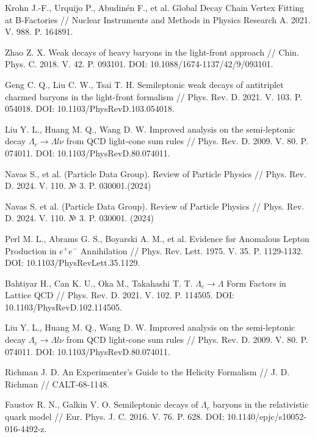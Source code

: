 \begin{thebibliography}{99}
    Krohn J.-F., Urquijo P., Abudinén F., et al. Global Decay Chain Vertex Fitting at B-Factories // Nuclear Instruments and Methods in Physics Research A. 2021. V. 988. P. 164891.

    Zhao Z. X. Weak decays of heavy baryons in the light-front approach // Chin. Phys. C. 2018. V. 42. P. 093101. DOI: 10.1088/1674-1137/42/9/093101.
    
    Geng C. Q., Liu C. W., Tsai T. H. Semileptonic weak decays of antitriplet charmed baryons in the light-front formalism // Phys. Rev. D. 2021. V. 103. P. 054018. DOI: 10.1103/PhysRevD.103.054018.
    
    Liu Y. L., Huang M. Q., Wang D. W. Improved analysis on the semi-leptonic decay $\Lambda_c \to \Lambda l \nu$ from QCD light-cone sum rules // Phys. Rev. D. 2009. V. 80. P. 074011. DOI: 10.1103/PhysRevD.80.074011.

    Navas S., et al. (Particle Data Group). Review of Particle Physics // Phys. Rev. D. 2024. V. 110. $№$ 3. P. 030001.(2024)
    
    Navas S. et al. (Particle Data Group). Review of Particle Physics // Phys. Rev. D. 2024. V. 110. № 3. P. 030001. (2024)

    Perl M. L., Abrams G. S., Boyarski A. M., et al. Evidence for Anomalous Lepton Production in $e^+e^-$ Annihilation // Phys. Rev. Lett. 1975. V. 35. P. 1129-1132. DOI: 10.1103/PhysRevLett.35.1129.

    Bahtiyar H., Can K. U., Oka M., Takahashi T. T. $\Lambda_c \to \Lambda$ Form Factors in Lattice QCD // Phys. Rev. D. 2021. V. 102. P. 114505. DOI: 10.1103/PhysRevD.102.114505.    

    Liu Y. L., Huang M. Q., Wang D. W. Improved analysis on the semi-leptonic decay $\Lambda_c \to \Lambda l \nu$ from QCD light-cone sum rules // Phys. Rev. D. 2009. V. 80. P. 074011. DOI: 10.1103/PhysRevD.80.074011.

    Richman J. D. An Experimenter’s Guide to the Helicity Formalism // J. D. Richman // CALT-68-1148.

    Faustov R. N., Galkin V. O. Semileptonic decays of $\Lambda_c$ baryons in the relativistic quark model // Eur. Phys. J. C. 2016. V. 76. P. 628. DOI: 10.1140/epjc/s10052-016-4492-z.

\end{thebibliography}
